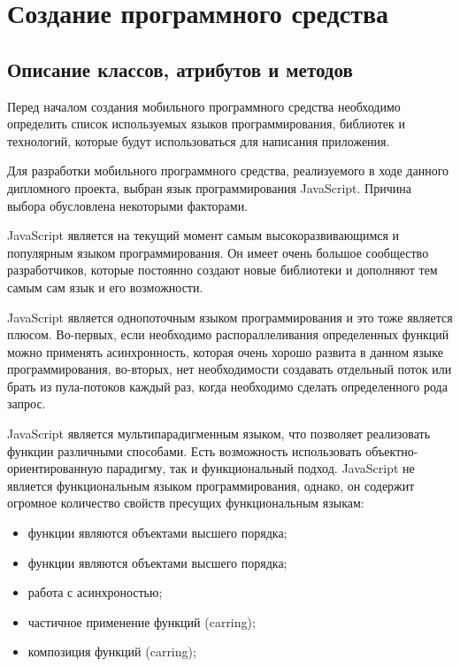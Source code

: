 \section{Создание программного средства} %
\label{sec:arch_and_mod}

\subsection{Описание классов, атрибутов и методов}
\label{sub:arch_and_mod:graphlib}

Перед началом создания мобильного программного средства необходимо определить список используемых языков программирования, библиотек и технологий, которые будут использоваться для написания приложения.

Для разработки мобильного программного средства, реализуемого в ходе данного дипломного проекта, выбран язык программирования JavaScript. Причина выбора обусловлена некоторыми факторами.

JavaScript является на текущий момент самым высокоразвивающимся и популярным языком программирования. Он имеет очень большое сообщество разработчиков, которые постоянно создают новые библиотеки и дополняют тем самым сам язык и его возможности.

JavaScript является однопоточным языком программирования и это тоже является плюсом. Во-первых, если необходимо распораллеливания определенных функций можно применять асинхронность, которая очень хорошо развита в данном языке программирования, во-вторых, нет необходимости создавать отдельный поток или брать из пула-потоков каждый раз, когда необходимо сделать определенного рода запрос.

JavaScript является мультипарадигменным языком, что позволяет реализовать функции различными способами. Есть возможность использовать объектно-ориентированную парадигму, так и функциональный подход. JavaScript не является функциональным языком программирования, однако, он содержит огромное количество свойств пресущих функциональным языкам:

\begin{itemize}
  \item функции являются объектами высшего порядка;
  \item функции являются объектами высшего порядка;
  \item работа с асинхроностью;
  \item частичное применение функций (carring);
  \item композиция функций (carring);
\end{itemize}

